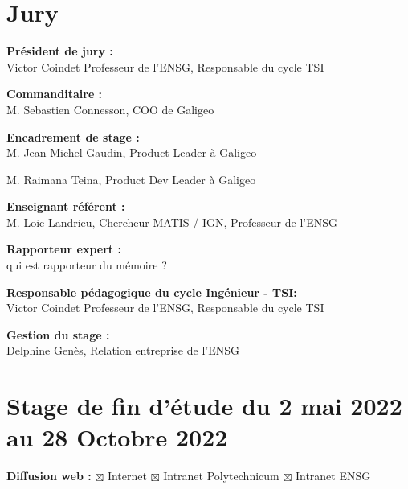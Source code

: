 \thispagestyle{plain}
\section*{Jury}
\vspace{0.5cm}

\textbf{Président de jury :} \\

Victor Coindet
Professeur de l'ENSG, Responsable du cycle TSI

\vspace{0.5cm}

\textbf{Commanditaire :} \\

M. Sebastien Connesson, COO de Galigeo

\vspace{0.5cm}

\textbf{Encadrement de stage :} \\ 

M. Jean-Michel Gaudin, Product Leader à Galigeo

M. Raimana Teina, Product Dev Leader à Galigeo

\vspace{0.5cm}

\textbf{Enseignant référent :} \\ 

M. Loic Landrieu, Chercheur MATIS / IGN, Professeur de l'ENSG

\vspace{0.5cm}

\textbf{Rapporteur expert :} \\ 

qui est rapporteur du mémoire ?

\vspace{0.5cm}

\textbf{Responsable pédagogique du cycle Ingénieur - TSI:} \\

Victor Coindet
Professeur de l'ENSG, Responsable du cycle TSI

\vspace{0.5cm}

\textbf{Gestion du stage :} \\ 

Delphine Genès, Relation entreprise de l'ENSG

\vspace{0.5cm}


\section*{Stage de fin d'étude du 2 mai 2022 au 28 Octobre 2022}
\vspace{0.3cm}
\textbf{Diffusion web :} $\boxtimes$ Internet \hspace{0.2cm}$\boxtimes$ Intranet Polytechnicum\hspace{0.2cm}
$\boxtimes$ Intranet ENSG\vspace{0.3cm}

